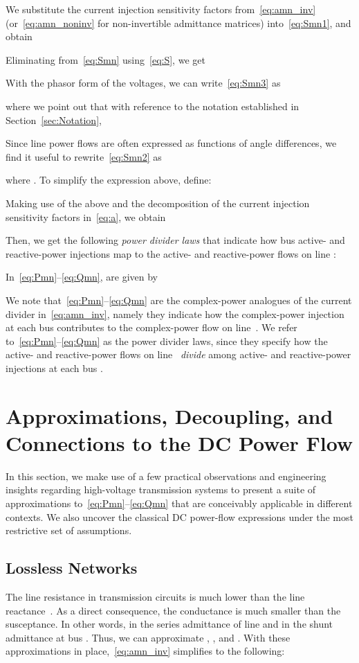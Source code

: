 \documentclass[journal]{IEEEtran}
\theoremstyle{definition}
\begin{document}
We substitute the current injection sensitivity factors from~\eqref{eq:amn_inv} (or~\eqref{eq:amn_noninv} for non-invertible admittance matrices) into~\eqref{eq:Smn1}, and obtain

Eliminating  from~\eqref{eq:Smn} using~\eqref{eq:S}, we get 

With the phasor form of the voltages, we can write~\eqref{eq:Smn3} as

where we point out that with reference to the notation established in Section~\ref{sec:Notation}, 

Since line power flows are often expressed as functions of angle differences, we find it useful to rewrite~\eqref{eq:Smn2} as

where .  To simplify the expression above, define:

Making use of the above and the decomposition of the current injection sensitivity factors in~\eqref{eq:a}, we obtain

Then, we get the following \emph{power divider laws}  that indicate how bus active- and reactive-power  injections map to the active- and reactive-power flows on line : 

In~\eqref{eq:Pmn}--\eqref{eq:Qmn},  are given by 


We note that~\eqref{eq:Pmn}--\eqref{eq:Qmn} are the complex-power analogues of the current divider in~\eqref{eq:amn_inv}, namely they indicate how the complex-power injection at each bus  contributes to the complex-power flow on line~.  We refer to~\eqref{eq:Pmn}--\eqref{eq:Qmn} as the power divider laws, since they specify how the active- and reactive-power flows on line~ \emph{divide} among active- and reactive-power injections at each bus .



\section{Approximations, Decoupling, and Connections to the DC Power Flow} \label{sec:approx}
In this section, we make use of a few practical observations and engineering insights regarding high-voltage transmission systems to present a suite of approximations to~\eqref{eq:Pmn}--\eqref{eq:Qmn} that are conceivably applicable in different contexts. We also uncover the classical DC power-flow expressions under the most restrictive set of assumptions.

\subsection{Lossless Networks} \label{sec:lossless}
The line resistance in transmission circuits is much lower than the line reactance~\cite{Glover:2012}.  As a direct consequence, the conductance is much smaller than the susceptance.  In other words,  in the series admittance of line  and  in the shunt admittance at bus .  Thus, we can approximate
, , and . With these approximations in place,~\eqref{eq:amn_inv} simplifies to the following:
\end{document}
